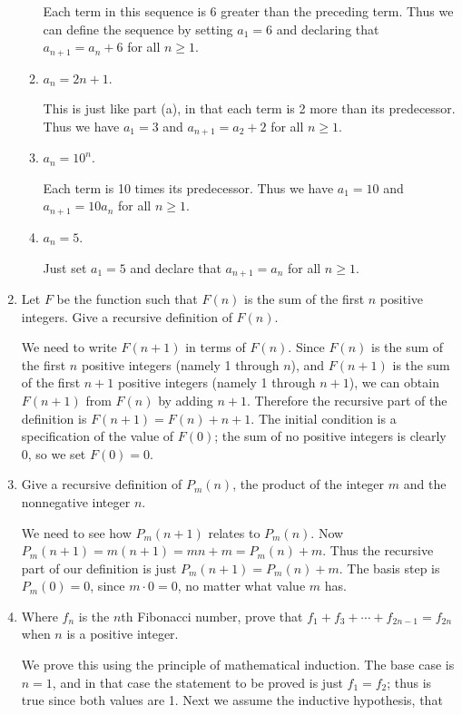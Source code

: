 \documentclass[11pt]{article}
\begin{document}
\begin{enumerate}[label=\textbf{\arabic*.}]
\begin{enumerate}[label=\textbf{\alph*)}]
		Each term in this sequence is 6 greater than the preceding term. Thus we can define the sequence by setting $a_1 = 6$ and declaring that $a_{n + 1} = a_n + 6$ for all $n \geq 1$.
		
		\item $a_n = 2n + 1$.
		
		This is just like part (a), in that each term is 2 more than its predecessor. Thus we have $a_1 = 3$ and $a_{n + 1} = a_2 + 2$ for all $n \geq 1$.
		
		\item $a_n = 10^n$.
		
		Each term is 10 times its predecessor. Thus we have $a_1 = 10$ and $a_{n + 1} = 10a_n$ for all $n \geq 1$.
		
		\item $a_n = 5$.
		
		Just set $a_1 = 5$ and declare that $a_{n + 1} = a_n$ for all $n \geq 1$.
	\end{enumerate}

	\item Let $F$ be the function such that $F(n)$ is the sum of the first $n$ positive integers. Give a recursive definition of $F(n)$.
	
	We need to write $F(n + 1)$ in terms of $F(n)$. Since $F(n)$ is the sum of the first $n$ positive integers (namely 1 through $n$), and $F(n + 1)$ is the sum of the first $n + 1$ positive integers (namely 1 through $n + 1$), we can obtain $F(n + 1)$ from $F(n)$ by adding $n + 1$. Therefore the recursive part of the definition is $F(n + 1) = F(n) + n + 1$. The initial condition is a specification of the value of $F(0)$; the sum of no positive integers is clearly 0, so we set $F(0) = 0$.
	
	\item Give a recursive definition of $P_m(n)$, the product of the integer $m$ and the nonnegative integer $n$.
	
	We need to see how $P_m(n + 1)$ relates to $P_m(n)$. Now $P_m(n + 1) = m(n + 1) = mn + m = P_m(n) + m$. Thus the recursive part of our definition is just $P_m(n + 1) = P_m(n) + m$. The basis step is $P_m(0) = 0$, since $m \cdot 0 = 0$, no matter what value $m$ has.
	
	\item Where $f_n$ is the $n$th Fibonacci number, prove that $f_1 + f_3 + \cdots + f_{2n - 1} = f_{2n}$ when $n$ is a positive integer.
	
	We prove this using the principle of mathematical induction. The base case is $n = 1$, and in that case the statement to be proved is just $f_1 = f_2$; thus is true since both values are 1. Next we assume the inductive hypothesis, that
	

\end{enumerate}
\end{document}
